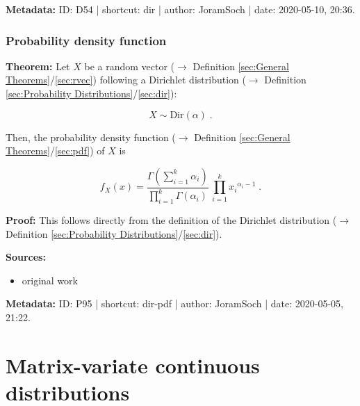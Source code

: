 \documentclass[a4paper,12pt,twoside]{book}
\begin{document}
\vspace{1em}
\textbf{Metadata:} ID: D54 | shortcut: dir | author: JoramSoch | date: 2020-05-10, 20:36.
\vspace{1em}



\subsubsection[\textbf{Probability density function}]{Probability density function} \label{sec:dir-pdf}
\setcounter{equation}{0}

\textbf{Theorem:} Let $X$ be a random vector ($\rightarrow$ Definition \ref{sec:General Theorems}/\ref{sec:rvec}) following a Dirichlet distribution ($\rightarrow$ Definition \ref{sec:Probability Distributions}/\ref{sec:dir}):

\begin{equation} \label{eq:dir-pdf-Dir}
X \sim \mathrm{Dir}(\alpha) \; .
\end{equation}

Then, the probability density function ($\rightarrow$ Definition \ref{sec:General Theorems}/\ref{sec:pdf}) of $X$ is

\begin{equation} \label{eq:dir-pdf-Dir-pdf}
f_X(x) = \frac{\Gamma\left( \sum_{i=1}^k \alpha_i \right)}{\prod_{i=1}^k \Gamma(\alpha_i)} \, \prod_{i=1}^k {x_i}^{\alpha_i-1} \; .
\end{equation}


\vspace{1em}
\textbf{Proof:} This follows directly from the definition of the Dirichlet distribution ($\rightarrow$ Definition \ref{sec:Probability Distributions}/\ref{sec:dir}).


\vspace{1em}
\textbf{Sources:}
\begin{itemize}
\item original work\end{itemize}


\vspace{1em}
\textbf{Metadata:} ID: P95 | shortcut: dir-pdf | author: JoramSoch | date: 2020-05-05, 21:22.
\vspace{1em}



\pagebreak
\section{Matrix-variate continuous distributions}
\end{document}
